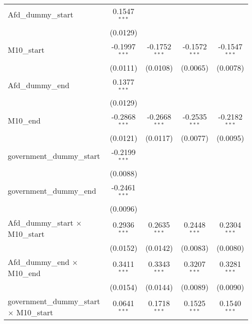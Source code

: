 \documentclass[10pt,a4paper]{article}
\begin{document}
\begin{tabular}{lcccc}
   Afd\_dummy\_start                                & 0.1547$^{***}$  &                 &                 &   \\   
                                                    & (0.0129)        &                 &                 &   \\   
   M10\_start                                       & -0.1997$^{***}$ & -0.1752$^{***}$ & -0.1572$^{***}$ & -0.1547$^{***}$\\   
                                                    & (0.0111)        & (0.0108)        & (0.0065)        & (0.0078)\\   
   Afd\_dummy\_end                                  & 0.1377$^{***}$  &                 &                 &   \\   
                                                    & (0.0129)        &                 &                 &   \\   
   M10\_end                                         & -0.2868$^{***}$ & -0.2668$^{***}$ & -0.2535$^{***}$ & -0.2182$^{***}$\\   
                                                    & (0.0121)        & (0.0117)        & (0.0077)        & (0.0095)\\   
   government\_dummy\_start                         & -0.2199$^{***}$ &                 &                 &   \\   
                                                    & (0.0088)        &                 &                 &   \\   
   government\_dummy\_end                           & -0.2461$^{***}$ &                 &                 &   \\   
                                                    & (0.0096)        &                 &                 &   \\   
   Afd\_dummy\_start $\times$ M10\_start            & 0.2936$^{***}$  & 0.2635$^{***}$  & 0.2448$^{***}$  & 0.2304$^{***}$\\   
                                                    & (0.0152)        & (0.0142)        & (0.0083)        & (0.0080)\\   
   Afd\_dummy\_end $\times$ M10\_end                & 0.3411$^{***}$  & 0.3343$^{***}$  & 0.3207$^{***}$  & 0.3281$^{***}$\\   
                                                    & (0.0154)        & (0.0144)        & (0.0089)        & (0.0090)\\   
   government\_dummy\_start $\times$ M10\_start     & 0.0641$^{***}$  & 0.1718$^{***}$  & 0.1525$^{***}$  & 0.1540$^{***}$\\   

\end{tabular}
\end{document}
